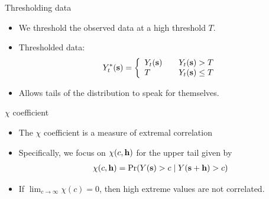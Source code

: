 \documentclass{beamer}
\begin{document}
\begin{frame}{Thresholding data}
  \begin{itemize} \setlength{\itemsep}{0.5em}
    \item We threshold the observed data at a high threshold $T$.
    \item Thresholded data:
    \begin{align*}
      Y_t^*(\mbox{\bf s}) = \left\{ \begin{array}{ll}
          Y_t(\mbox{\bf s}) \quad & Y_t(\mbox{\bf s}) > T\\
          T \quad & Y_t(\mbox{\bf s}) \le T
      \end{array}\right.
    \end{align*}
    \item Allows tails of the distribution to speak for themselves.
  \end{itemize}
\end{frame}

\begin{frame}{$\chi$ coefficient}
  \begin{itemize} \setlength{\itemsep}{0.5em}
   \item The $\chi$ coefficient is a measure of extremal correlation
   \item Specifically, we focus on $\chi(c, \mbox{\bf h})$ for the upper tail given by
    \begin{align*}
      \chi(c, \mbox{\bf h}) = \Pr(Y(\mbox{\bf s}) > c \mid Y(\mbox{\bf s} + \mbox{\bf h}) > c)
    \end{align*}
    \item If $\lim_{c \rightarrow \infty} \chi(c) = 0$, then high extreme values are not correlated.
  \end{itemize}
\end{frame}
\end{document}
